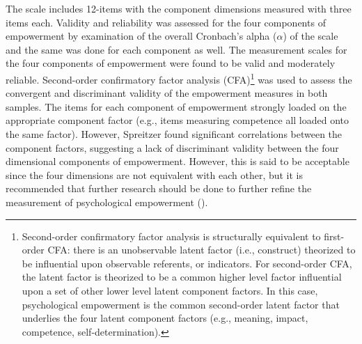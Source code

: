 \documentclass[
  11pt,
  a4paper,
]{article}
\begin{document}
The scale includes 12-items with the component dimensions measured with
three items each. Validity and reliability was assessed for the four
components of empowerment by examination of the overall Cronbach's alpha
(\(\alpha\)) of the scale and the same was done for each component as
well. The measurement scales for the four components of empowerment were
found to be valid and moderately reliable. Second-order confirmatory
factor analysis (CFA)\footnote{Second-order confirmatory factor analysis
  is structurally equivalent to first-order CFA: there is an
  unobservable latent factor (i.e., construct) theorized to be
  influential upon observable referents, or indicators. For second-order
  CFA, the latent factor is theorized to be a common higher level factor
  influential upon a set of other lower level latent component factors.
  In this case, psychological empowerment is the common second-order
  latent factor that underlies the four latent component factors (e.g.,
  meaning, impact, competence, self-determination).} was used to assess
the convergent and discriminant validity of the empowerment measures in
both samples. The items for each component of empowerment strongly
loaded on the appropriate component factor (e.g., items measuring
competence all loaded onto the same factor). However, Spreitzer found
significant correlations between the component factors, suggesting a
lack of discriminant validity between the four dimensional components of
empowerment. However, this is said to be acceptable since the four
dimensions are not equivalent with each other, but it is recommended
that further research should be done to further refine the measurement
of psychological empowerment ().
\end{document}
